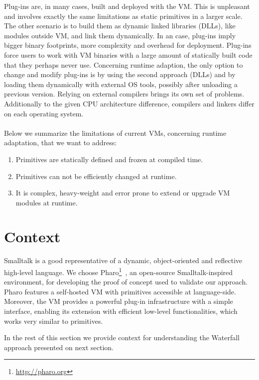 \documentclass[10pt,preprint,letter]{sigplanconf}
\newcommand{\ST}  {Small\-talk\xspace}
\newcommand{\PH}  {Pharo\xspace}
\newcommand{\W}{Waterfall\xspace}
\begin{document}
Plug-ins are, in many cases, built and deployed with the VM.
This is unpleasant and involves exactly the same limitations as static primitives in a larger scale.
The other scenario is to build them as dynamic linked libraries (DLLs), like modules outside VM, and link them dynamically.
In an case, plug-ins imply bigger binary footprints, more complexity and overhead for deployment.
Plug-ins force users to work with VM binaries with a large amount of statically built code that they perhaps never use.
Concerning runtime adaption, the only option to change and modify plug-ins is by using the second approach (DLLs) and by loading them dynamically with external OS tools, possibly after unloading a previous version.
Relying on external compilers brings its own set of problems.
Additionally to the given CPU architecture difference, compilers and linkers differ on each operating system.
\\\\
Below we summarize the limitations of current VMs, concerning runtime adaptation, that we want to address: 
\begin{enumerate}
	\item Primitives are statically defined and frozen at compiled time. 
	\item Primitives can not be efficiently changed at runtime.
	\item It is complex, heavy-weight and error prone to extend or upgrade VM modules at runtime.
\end{enumerate}



\section{Context}
\ST is a good representative of a dynamic, object-oriented and reflective high-level language.
We choose \PH\footnote{\url{http://pharo.org}}~\cite{Pharo,Blac09a}, an open-source \ST-inspired environment, for developing the proof of concept used to validate our approach.
\PH features a self-hosted VM with primitives accessible at language-side. 
Moreover, the VM  provides a powerful plug-in infrastructure with a simple interface, enabling its extension  with efficient low-level functionalities, which works very similar to primitives. 

In the rest of this section we provide context for understanding the \W approach presented on next section.
\end{document}

